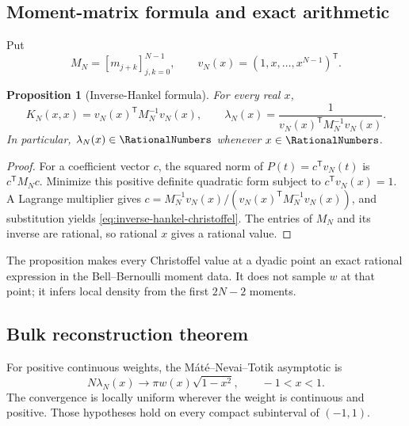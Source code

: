 \documentclass[11pt,oneside]{article}
\newtheorem{proposition}[theorem]{Proposition}
\theoremstyle{definition}
\theoremstyle{remark}
\numberwithin{equation}{section}
\begin{document}
\subsection{Moment-matrix formula and exact arithmetic}
Put
\begin{equation}
 M_N=[m_{j+k}]_{j,k=0}^{N-1},
 \qquad
 v_N(x)=(1,x,\ldots,x^{N-1})^{\mathsf T}.
 \label{eq:moment-vector}
\end{equation}

\begin{proposition}[Inverse-Hankel formula]
\label{prop:inverse-hankel-christoffel}
For every real $x$,
\begin{equation}
 K_N(x,x)=v_N(x)^{\mathsf T}M_N^{-1}v_N(x),
 \qquad
 \boxed{\lambda_N(x)=
 \frac1{v_N(x)^{\mathsf T}M_N^{-1}v_N(x)}.}
 \label{eq:inverse-hankel-christoffel}
\end{equation}
In particular, $\lambda_N(x)\in\RationalNumbers$ whenever $x\in\RationalNumbers$.
\end{proposition}

\begin{proof}
For a coefficient vector $c$, the squared norm of
$P(t)=c^{\mathsf T}v_N(t)$ is $c^{\mathsf T}M_Nc$.  Minimize this positive
definite quadratic form subject to $c^{\mathsf T}v_N(x)=1$.  A Lagrange
multiplier gives
$c=M_N^{-1}v_N(x)/(v_N(x)^{\mathsf T}M_N^{-1}v_N(x))$, and substitution
yields \cref{eq:inverse-hankel-christoffel}.  The entries of $M_N$ and its
inverse are rational, so rational $x$ gives a rational value.
\end{proof}

The proposition makes every Christoffel value at a dyadic point an exact
rational expression in the Bell--Bernoulli moment data.  It does not sample
$w$ at that point; it infers local density from the first $2N-2$ moments.

\subsection{Bulk reconstruction theorem}
For positive continuous weights, the M\'at\'e--Nevai--Totik asymptotic is
\cite{MateNevaiTotik,TotikChristoffel,DankaTotik}
\begin{equation}
 N\lambda_N(x)\longrightarrow
 \pi w(x)\sqrt{1-x^2},
 \qquad -1<x<1.
 \label{eq:christoffel-bulk}
\end{equation}
The convergence is locally uniform wherever the weight is continuous and
positive.  Those hypotheses hold on every compact subinterval of $(-1,1)$.
\end{document}
